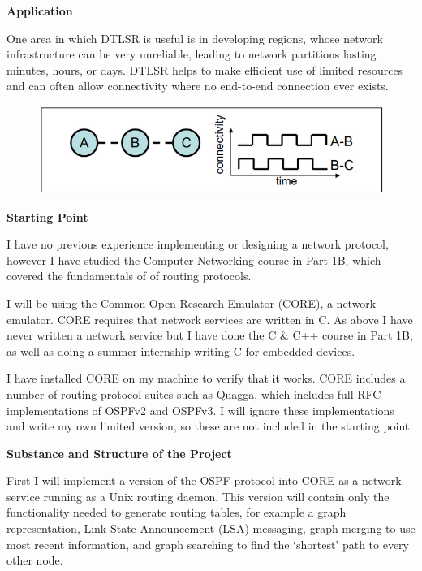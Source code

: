 \documentclass[withindex,glossary,openany]{cam-thesis}
\begin{document}
\vspace{8mm}
\Large\textbf{Application}\normalsize

One area in which DTLSR is useful is in developing regions, whose network infrastructure can be very unreliable, leading to network partitions lasting minutes, hours, or days. DTLSR helps to make efficient use of limited resources and can often allow connectivity where no end-to-end connection ever exists.

\begin{figure}[H]
  \centering
  \includegraphics[width=0.8\linewidth]{proposal_1}
\end{figure}

\vspace{8mm}
\LARGE\textbf{Starting Point}\normalsize

I have no previous experience implementing or designing a network protocol, however I have studied the Computer Networking course in Part 1B, which covered the fundamentals of of routing protocols.

I will be using the Common Open Research Emulator (CORE), a network emulator. CORE requires that network services are written in C. As above I have never written a network service but I have done the C \& C++ course in Part 1B, as well as doing a summer internship writing C for embedded devices.

I have installed CORE on my machine to verify that it works. CORE includes a number of routing protocol suites such as Quagga, which includes full RFC implementations of OSPFv2 and OSPFv3. I will ignore these implementations and write my own limited version, so these are not included in the starting point.

\vspace{8mm}
\LARGE\textbf{Substance and Structure of the Project}\normalsize

First I will implement a version of the OSPF protocol into CORE as a network service running as a Unix routing daemon. This version will contain only the functionality needed to generate routing tables, for example a graph representation, Link-State Announcement (LSA) messaging, graph merging to use most recent information, and graph searching to find the ‘shortest’ path to every other node.
\end{document}
